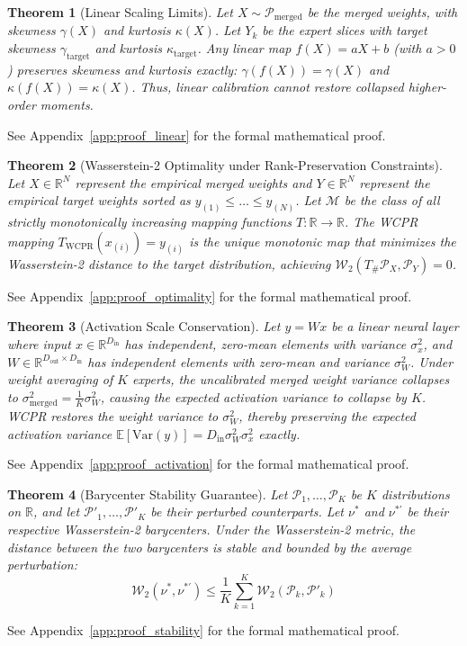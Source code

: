 \documentclass{article}
\theoremstyle{plain}
\newtheorem{theorem}{Theorem}[section]
\theoremstyle{definition}
\theoremstyle{remark}
\begin{document}
\begin{theorem}[Linear Scaling Limits]
\label{thm:linear}
  Let $X \sim \mathcal{P}_{\mathrm{merged}}$ be the merged weights, with skewness $\gamma(X)$ and kurtosis $\kappa(X)$. Let $Y_k$ be the expert slices with target skewness $\gamma_{\mathrm{target}}$ and kurtosis $\kappa_{\mathrm{target}}$. Any linear map $f(X) = a X + b$ (with $a > 0$) preserves skewness and kurtosis exactly: $\gamma(f(X)) = \gamma(X)$ and $\kappa(f(X)) = \kappa(X)$. Thus, linear calibration cannot restore collapsed higher-order moments.
\end{theorem}
See Appendix~\ref{app:proof_linear} for the formal mathematical proof.

\begin{theorem}[Wasserstein-2 Optimality under Rank-Preservation Constraints]
\label{thm:optimality}
  Let $X \in \mathbb{R}^N$ represent the empirical merged weights and $Y \in \mathbb{R}^N$ represent the empirical target weights sorted as $y_{(1)} \leq \dots \leq y_{(N)}$. Let $\mathcal{M}$ be the class of all strictly monotonically increasing mapping functions $T: \mathbb{R} \to \mathbb{R}$. The WCPR mapping $T_{\mathrm{WCPR}}(x_{(i)}) = y_{(i)}$ is the unique monotonic map that minimizes the Wasserstein-2 distance to the target distribution, achieving $\mathcal{W}_2(T_{\#}\mathcal{P}_X, \mathcal{P}_Y) = 0$.
\end{theorem}
See Appendix~\ref{app:proof_optimality} for the formal mathematical proof.

\begin{theorem}[Activation Scale Conservation]
\label{thm:activation}
  Let $y = W x$ be a linear neural layer where input $x \in \mathbb{R}^{D_{\mathrm{in}}}$ has independent, zero-mean elements with variance $\sigma_x^2$, and $W \in \mathbb{R}^{D_{\mathrm{out}} \times D_{\mathrm{in}}}$ has independent elements with zero-mean and variance $\sigma^2_W$. Under weight averaging of $K$ experts, the uncalibrated merged weight variance collapses to $\sigma_{\mathrm{merged}}^2 = \frac{1}{K}\sigma_W^2$, causing the expected activation variance to collapse by $K$. WCPR restores the weight variance to $\sigma_W^2$, thereby preserving the expected activation variance $\mathbb{E}[\mathrm{Var}(y)] = D_{\mathrm{in}} \sigma^2_W \sigma^2_x$ exactly.
\end{theorem}
See Appendix~\ref{app:proof_activation} for the formal mathematical proof.

\begin{theorem}[Barycenter Stability Guarantee]
\label{thm:stability}
  Let $\mathcal{P}_1, \dots, \mathcal{P}_K$ be $K$ distributions on $\mathbb{R}$, and let $\mathcal{P}'_1, \dots, \mathcal{P}'_K$ be their perturbed counterparts. Let $\nu^*$ and $\nu^{*'}$ be their respective Wasserstein-2 barycenters. Under the Wasserstein-2 metric, the distance between the two barycenters is stable and bounded by the average perturbation:
  \begin{equation}
    \mathcal{W}_2(\nu^*, \nu^{*'}) \leq \frac{1}{K} \sum_{k=1}^K \mathcal{W}_2(\mathcal{P}_k, \mathcal{P}'_k)
  \end{equation}
\end{theorem}
See Appendix~\ref{app:proof_stability} for the formal mathematical proof.
\end{document}

